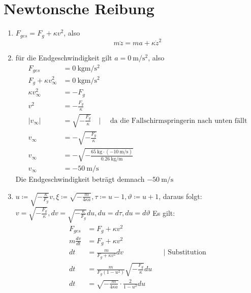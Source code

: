 \documentclass[sectionformat = aufgabe]{gadsescript}
\begin{document}
\maketitle

\section{Newtonsche Reibung}
\begin{enumerate}[label=\alph*)]
	\item $ F_{ges} = F_g + \kappa v^2 $, also
		\[ m \ddot z = ma + \kappa \dot z^2 \]
	\item für die Endgeschwindigkeit gilt $ a = \qty{0}{\metre\per\square\second} $, also
		\begin{align*}
			F_{ges} &= \qty{0}{\kilogram\metre\per\square\second}\\
			F_g + \kappa v_{\infty}^2 &= \qty{0}{\kilogram\metre\per\square\second}\\
			\kappa v_\infty^2 &= -F_g\\
			v^2 &= -\frac{F_g}{\kappa}\\
			\left|v_\infty\right| &= \sqrt{-\frac{F_g}{\kappa}} \quad | \quad \text{ da die Fallschirmspringerin nach unten fällt}\\
			v_\infty &= - \sqrt{-\frac{F_g}{\kappa}}\\
			v_\infty &= - \sqrt{-\frac{\qty{65}{\kilogram} \cdot \left( \qty{-10}{\metre\per\second} \right)}{\qty{0.26}{\kilogram\per\metre}}}\\
			v_\infty &= \qty{-50}{\metre\per\second}
		\end{align*}
		Die Endgeschwindigkeit beträgt demnach $\qty{-50}{\metre\per\second} $
	\item $ u \coloneqq \sqrt{-\frac{\kappa}{F_g}} v, \xi \coloneqq \sqrt{-\frac{m}{4\kappa a}}, \tau \coloneqq u - 1, \vartheta \coloneqq u + 1 $, daraus folgt:\\
		$ v = \sqrt{-\frac{F_g}{\kappa}}, dv = \sqrt{-\frac{\kappa}{F_g}} du, du = d\tau, du = d\vartheta $
		Es gilt:
		\begin{align*}
			F_{ges} &= F_g + \kappa v^2\\
			m \frac{dv}{dt} &= F_g + \kappa v^2\\
			dt &= \frac{m}{F_g + \kappa v^2} dv &&| \text{ Substitution}\\
			dt &= \frac{m}{F_g ( 1 - u^2)} \sqrt{-\frac{F_g}{\kappa}} du\\
			dt &=  \sqrt{-\frac{m}{4\kappa a}} \cdot \frac{2}{ 1 - u^2} du\\

\end{align*}
\end{enumerate}
\end{document}
